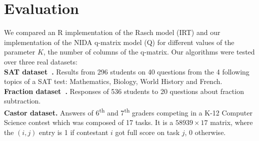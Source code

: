 \documentclass{edm_template}
\begin{document}
\section{Evaluation}

We compared an R implementation of the Rasch model (\textsf{IRT}) and our implementation of the NIDA q-matrix model (\textsf{Q}) for different values of the parameter $K$, the number of columns of the q-matrix. Our algorithms were tested over three real datasets:\\
\textbf{SAT dataset~\cite{Desmarais2011}.} Results from 296 students on 40 questions from the 4 following topics of a SAT test: Mathematics, Biology, World History and French.\\
\textbf{Fraction dataset~\cite{DeCarlo2010}.} Responses of 536 students to 20 questions about fraction subtraction.\\ %
\textbf{Castor dataset.} Answers of 6\textsuperscript{th} and 7\textsuperscript{th} graders competing in a K-12 Computer Science contest which was composed of 17 tasks. It is a $58939 \times 17$ matrix, where the $(i, j)$ entry is 1 if contestant $i$ got full score on task $j$, 0 otherwise.

%
%
%
%
\end{document}
